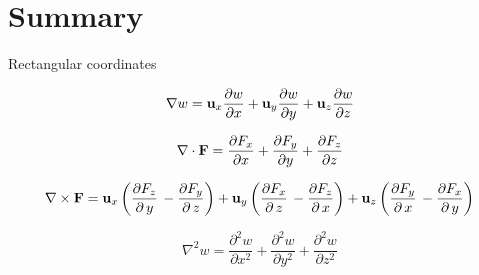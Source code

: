 \documentclass[handout,10pt]{beamer}
\begin{document}
\section{Summary}
\begin{frame}[shrink=00]{Rectangular coordinates}



%
\begin{equation}
 \nabla w = {\bf u}_x \frac{\partial w}{\partial x} + {\bf u}_y \frac{\partial w}{\partial y} + {\bf u}_z \frac{\partial w}{\partial z} 
  \label{graddefr}
\end{equation}
%


%
\begin{equation}
 \nabla \cdot {\bf F} = \frac{\partial F_x}{\partial x} +  \frac{\partial F_y}{\partial y} +  \frac{\partial F_z}{\partial z}
 \label{divdefr}
\end{equation}
%



%
\begin{equation}
 \nabla \times {\bf F} = 
{\bf u}_x \left(\frac{\partial {F}_{z}}{\partial\,y}\,-\frac{\partial {F}_{y}}{\partial\,z}\right) 
 + {\bf u}_y \left(\frac{\partial {F}_{x}}{\partial\,z}\,-\frac{\partial {F}_{z}}{\partial\,x} \right) 
 +  {\bf u}_z \left(\frac{\partial {F}_{y}}{\partial\,x}\,-\frac{\partial {F}_{x}}{\partial\,y}\right)
 \label{curldefr}
\end{equation}
%



%
\begin{equation}
 \nabla^2 w =  \frac{\partial^2 w}{\partial x^2} +  \frac{\partial^2 w}{\partial y^2} +  \frac{\partial^2 w}{\partial z^2} 
 \label{Laplacianr}
\end{equation}
%

\end{frame}
\end{document}
